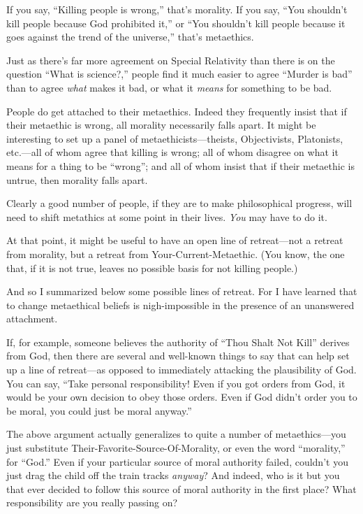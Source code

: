 {
 If you say, ``Killing people is
wrong,'' that's morality. If you say,
``You shouldn't kill people because
God prohibited it,'' or ``You
shouldn't kill people because it goes against the trend
of the universe,'' that's
metaethics.}

{
 Just as there's far more agreement on Special
Relativity than there is on the question ``What is
science?,'' people find it much easier to agree
``Murder is bad'' than to agree
\textit{what} makes it bad, or what it \textit{means} for something to
be bad.}

{
 People do get attached to their metaethics. Indeed they frequently
insist that if their metaethic is wrong, all morality necessarily falls
apart. It might be interesting to set up a panel of
metaethicists---theists, Objectivists, Platonists, etc.---all of whom
agree that killing is wrong; all of whom disagree on what it means for
a thing to be ``wrong''; and all of
whom insist that if their metaethic is untrue, then morality falls
apart.}

{
 Clearly a good number of people, if they are to make philosophical
progress, will need to shift metathics at some point in their lives.
\textit{You} may have to do it.}

{
 At that point, it might be useful to have an open line of
retreat---not a retreat from morality, but a retreat from
Your-Current-Metaethic. (You know, the one that, if it is not true,
leaves no possible basis for not killing people.)}

{
 And so I summarized below some possible lines of retreat. For I
have learned that to change metaethical beliefs is nigh-impossible in
the presence of an unanswered attachment.}

{
 If, for example, someone believes the authority of
``Thou Shalt Not Kill'' derives from
God, then there are several and well-known things to say that can help
set up a line of retreat---as opposed to immediately attacking the
plausibility of God. You can say, ``Take personal
responsibility! Even if you got orders from God, it would be your own
decision to obey those orders. Even if God didn't order
you to be moral, you could just be moral anyway.''}

{
 The above argument actually generalizes to quite a number of
metaethics---you just substitute Their-Favorite-Source-Of-Morality, or
even the word ``morality,'' for
``God.'' Even if your particular
source of moral authority failed, couldn't you just
drag the child off the train tracks \textit{anyway}? And indeed, who is
it but you that ever decided to follow this source of moral authority
in the first place? What responsibility are you really passing on?}

